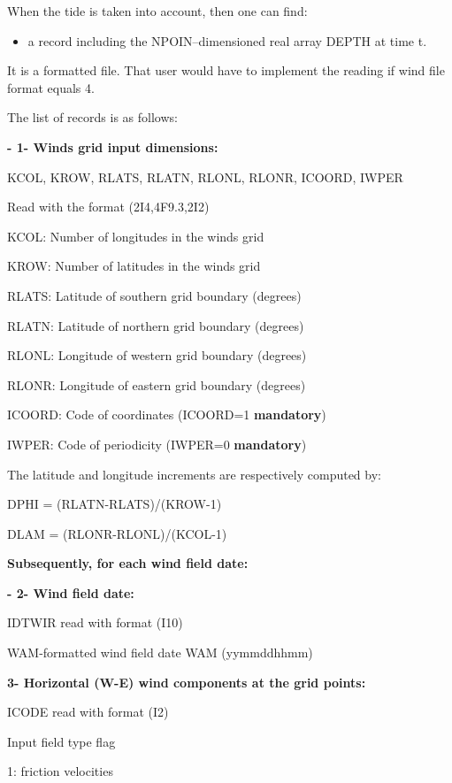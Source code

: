  When the tide is taken into account, then one can find:

\begin{itemize}
\item  a record including the NPOIN--dimensioned real array DEPTH at time t.
\end{itemize}

\underbar{ }\textbf{}

 It is a formatted file. That user would have to implement the reading if wind file format equals 4.   

 The list of records is as follows:

 \textbf{- 1- Winds grid input dimensions:}

 KCOL, KROW, RLATS, RLATN, RLONL, RLONR, ICOORD, IWPER

  Read with the format (2I4,4F9.3,2I2)

  KCOL: Number of longitudes in the winds grid

  KROW: Number of latitudes in the winds grid

  RLATS: Latitude of southern grid boundary (degrees)

  RLATN: Latitude of northern grid boundary (degrees)

  RLONL: Longitude of western grid boundary (degrees)

  RLONR: Longitude of eastern grid boundary (degrees)

  ICOORD: Code of coordinates (ICOORD=1 \textbf{mandatory})

  IWPER: Code of periodicity (IWPER=0 \textbf{mandatory})

 The latitude and longitude increments are respectively computed by:

 DPHI = (RLATN-RLATS)/(KROW-1)

 DLAM = (RLONR-RLONL)/(KCOL-1)

\textbf{ Subsequently, for each wind field date:}

 \textbf{- 2- Wind field date:}

 IDTWIR read with format (I10)

  WAM-formatted wind field date WAM (yymmddhhmm)

 \textbf{ 3- Horizontal (W-E) wind components at the grid points:}

 ICODE read with format (I2)

  Input field type flag

   1: friction velocities

